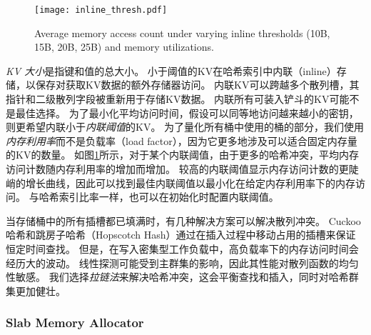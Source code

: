 \begin{figure}[t]
\centering
\texttt{[image: inline\_thresh.pdf]}
\caption{Average memory access count under varying inline thresholds (10B, 15B, 20B, 25B) and memory utilizations.}
\label{kvdirect:fig:inline-offline}

\end{figure}

\textit {KV 大小}是指键和值的总大小。
小于阈值的KV在哈希索引中内联（inline）存储，以保存对获取KV数据的额外存储器访问。
内联KV可以跨越多个散列槽，其指针和二级散列字段被重新用于存储KV数据。
内联所有可装入铲斗的KV可能不是最佳选择。
为了最小化平均访问时间，假设可以同等地访问越来越小的密钥，则更希望内联小于\textit {内联阈值}的KV。
为了量化所有桶中使用的桶的部分，我们使用\textit {内存利用率}而不是负载率（load factor），因为它更多地涉及可以适合固定内存量的KV的数量。
如图\ref {kvdirect:fig:inline-offline}所示，对于某个内联阈值，由于更多的哈希冲突，平均内存访问计数随内存利用率的增加而增加。
较高的内联阈值显示内存访问计数的更陡峭的增长曲线，因此可以找到最佳内联阈值以最小化在给定内存利用率下的内存访问。
与哈希索引比率一样，也可以在初始化时配置内联阈值。

当存储桶中的所有插槽都已填满时，有几种解决方案可以解决散列冲突。
Cuckoo哈希\cite {pagh2004cuckoo}和跳房子哈希（Hopscotch Hash）\cite {herlihy2008hopscotch}通过在插入过程中移动占用的插槽来保证恒定时间查找。
但是，在写入密集型工作负载中，高负载率下的内存访问时间会经历大的波动。
线性探测可能受到主群集的影响，因此其性能对散列函数的均匀性敏感。
我们选择\textit {拉链法}来解决哈希冲突，这会平衡查找和插入，同时对哈希群集更加健壮。


\subsubsection{Slab Memory Allocator}
\label{kvdirect:sec:slab}

